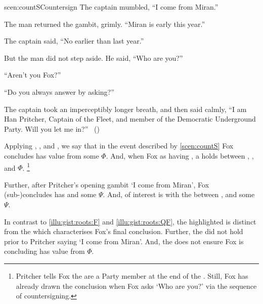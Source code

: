\begin{note}
  \begin{rscenario}{scen:countS}{Countersign}%
    \indent The captain mumbled, ``I come from Miran.''

    The man returned the gambit, grimly.
    ``Miran is early this year.''

    The captain said, ``No earlier than last year.''

    But the man did not step aside.
    He said, ``Who are you?''

    ``Aren't you Fox?''

    ``Do you always answer by asking?''

    The captain took an imperceptibly longer breath, and then said calmly,
    ``I am Han Pritcher, Captain of the Fleet, and member of the Democratic Underground Party.
    Will you let me in?''%
    \mbox{ }\hfill\mbox{(\cite[70]{Asimov:1945aa})}%
    \newline
  \end{rscenario}

  \noindent%
  Applying , , and , we say that in the event described by \autoref{scen:countS} Fox concludes \propI{\signConA{}} has value  from some \pool{} \(\Phi\).
  And, when Fox \evals{} \propI{\signConA{}} as having , a \ros{} holds between \propI{\signConA{}}, , and \(\Phi\).%
  \footnote{
    Pritcher tells Fox the are a Party member at the end of the \scen{}.
    Still, Fox has already drawn the conclusion when Fox asks `Who are you?' via the sequence of countersigning.
  }

  Further, after Pritcher's opening gambit `I come from Miran', Fox (sub-)concludes  has   and some \pool{} \(\Psi\).
  And, of interest is with the \ros{} between ,  and some \pool{} \(\Psi\).

  In contrast to  \ref{illu:gist:roots:F} and \ref{illu:gist:roots:QF}, the highlighted \ros{} is distinct from the \ros{} which characterises Fox's final conclusion.
  Further, the \ros{} did not hold prior to Pritcher saying `I come from Miran'.
  And, the \ros{} does not ensure Fox is concluding \propI{\signConA{}} has value  from \(\Phi\).


\end{note}
